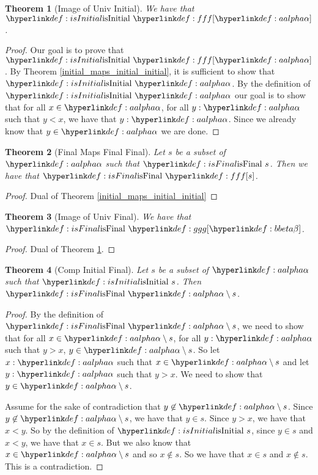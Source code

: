 \documentclass{article}
\newtheorem{theorem}{Theorem}
\theoremstyle{definition}
\begin{document}
\begin{theorem}[Image of Univ Initial]
\label{image_of_univ_initial}
We have that $\isInitial{\tf[\aalpha]}$.
\end{theorem}
\begin{proof}
Our goal is to prove that $\isInitial{\tf[\aalpha]}$. By Theorem \ref{initial_maps_initial_initial}, it is sufficient to show that $\isInitial{\aalpha}$. By the definition of $\isInitial{\aalpha}$ our goal is to show that for all $x\in \aalpha$, for all $y : \aalpha $ such that $y < x$, we have that $y : \aalpha$. Since we already know that $y\in \aalpha$ we are done.
\end{proof}

\begin{theorem}[Final Maps Final Final]
\label{final_maps_final_final}
Let $s$ be a subset of $\aalpha$ such that $\isFinal{s}$. Then we have that $\isFinal{\tf[s]}$.
\end{theorem}
\begin{proof}
Dual of Theorem \ref{initial_maps_initial_initial}
\end{proof}

\begin{theorem}[Image of Univ Final]
\label{image_of_univ_final}
We have that $\isFinal{\tg[\bbeta]}$.
\end{theorem}
\begin{proof}
Dual of Theorem \ref{image_of_univ_initial}.
\end{proof}

\begin{theorem}[Comp Initial Final]
\label{comp_initial_final}
Let $s$ be a subset of $\aalpha$ such that $\isInitial{s}$. Then $\isFinal{\aalpha\setminus s}$.
\end{theorem}
\begin{proof}
By the definition of $\isFinal{\aalpha\setminus s}$, we need to show that for all $x \in \aalpha \setminus s$, for all $y : \aalpha$ such that $y > x$, $y\in \aalpha \setminus s$. So let $x : \aalpha$ such that $x \in \aalpha\setminus s$ and let $y : \aalpha$ such that $y > x$. We need to show that $y\in \aalpha \setminus s$.

Assume for the sake of contradiction that $y\not\in \aalpha\setminus s$. Since $y\not\in \aalpha\setminus s$, we have that $y\in s$. Since $y > x$, we have that $x < y$. So by the definition of $\isInitial{s}$, since $y\in s$ and $x < y$, we have that $x\in s$. But we also know that $x\in \aalpha\setminus s$ and so $x\not\in s$. So we have that $x\in s$ and $x\not\in s$. This is a contradiction.
\end{proof}
\end{document}
